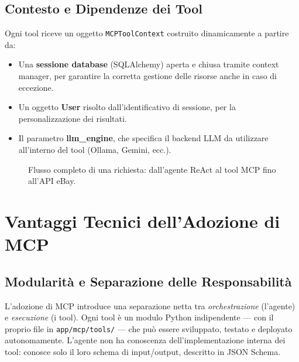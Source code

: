 \subsection{Contesto e Dipendenze dei Tool}
\label{subsec:mcp-context}

Ogni tool riceve un oggetto \texttt{MCPToolContext} costruito
dinamicamente a partire da:

\begin{itemize}
    \item Una \textbf{sessione database} (SQLAlchemy) aperta e chiusa
        tramite context manager, per garantire la corretta gestione
        delle risorse anche in caso di eccezione.
    \item Un oggetto \textbf{User} risolto dall'identificativo di
        sessione, per la personalizzazione dei risultati.
    \item Il parametro \textbf{llm\_engine}, che specifica il backend
        LLM da utilizzare all'interno del tool (Ollama, Gemini, ecc.).
\end{itemize}

\begin{figure}[htbp]
    \centering
    \caption{Flusso completo di una richiesta: dall'agente ReAct
    al tool MCP fino all'API eBay.}
    \label{fig:mcp-request-flow}
\end{figure}


\section{Vantaggi Tecnici dell'Adozione di MCP}
\label{sec:mcp-benefits}

\subsection{Modularità e Separazione delle Responsabilità}
\label{subsec:mcp-modularity}

L'adozione di MCP introduce una separazione netta tra \emph{orchestrazione}
(l'agente) e \emph{esecuzione} (i tool). Ogni tool è un modulo Python
indipendente — con il proprio file in \texttt{app/mcp/tools/} — che può
essere sviluppato, testato e deployato autonomamente. L'agente non ha
conoscenza dell'implementazione interna dei tool: conosce solo il loro
schema di input/output, descritto in JSON Schema.

